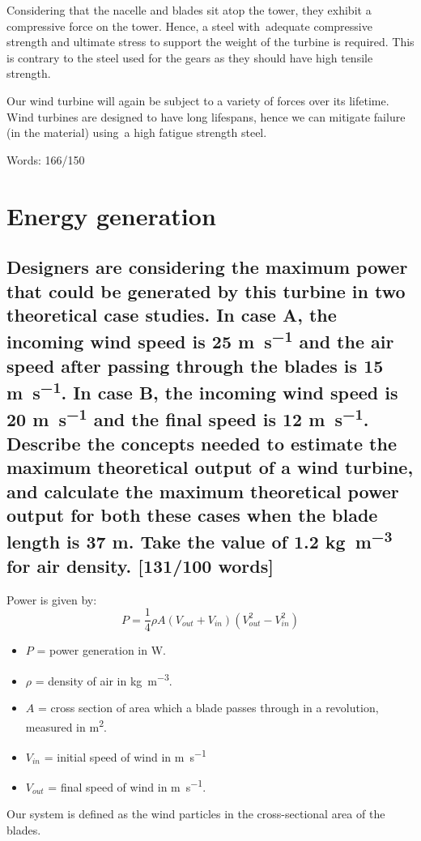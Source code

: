 \documentclass[12pt]{article}
\numberwithin{equation}{section}
\begin{document}
\begin{flushleft}
Considering that the nacelle and blades sit atop the tower, they exhibit a compressive force on the tower. Hence, a steel with adequate compressive strength and ultimate stress to support the weight of the turbine is required. This is contrary to the steel used for the gears as they should have high tensile strength. 

Our wind turbine will again be subject to a variety of forces over its lifetime. Wind turbines are designed to have long lifespans, hence we can mitigate failure (in the material) using a high fatigue strength steel.

Words: 166/150

\section{Energy generation}
\subsection[Maximum power generation.]{Designers are considering the maximum power that could be generated by this turbine in two theoretical case studies. In case A, the incoming wind speed is 25 \si{\meter\per\second} and the air speed after passing through the blades is 15 \si{\meter\per\second}. In case B, the incoming wind speed is 20 \si{\meter\per\second} and the final speed is 12 \si{\meter\per\second}. Describe the concepts needed to estimate the maximum theoretical output of a wind turbine, and calculate the maximum theoretical power output for both these cases when the blade length is 37 \si{\meter}. Take the value of 1.2 \si{\kg\per\meter\cubed} for air density. [131/100 words]}
Power is given by:
\begin{equation}
  P = \frac{1}{4} \rho A (V_{out} + V_{in})(V_{out}^2 - V_{in}^2)
\end{equation}
\begin{itemize}
  \item $P$ = power generation in \si{\watt}.
  \item $\rho$ = density of air in \si{\kg\per\meter\cubed}.
  \item $A$ = cross section of area which a blade passes through in a revolution, measured in \si{\meter\squared}.
  \item $V_{in}$ = initial speed of wind in \si{\meter\per\second}
  \item $V_{out}$ = final speed of wind in \si{\meter\per\second}.
\end{itemize}
Our system is defined as the wind particles in the cross-sectional area of the blades.

\end{flushleft}
\end{document}
